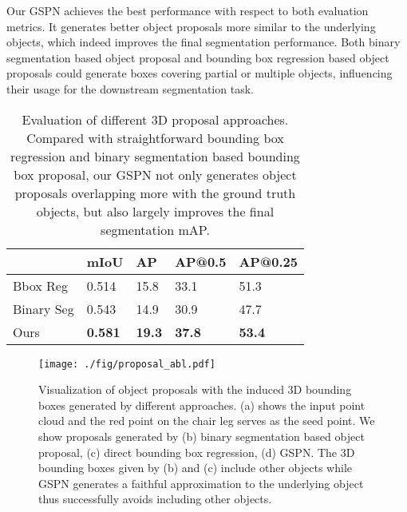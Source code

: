\documentclass[10pt,twocolumn,letterpaper]{article}
\begin{document}
Our GSPN achieves the best performance with respect to both evaluation metrics. It generates better object proposals more similar to the underlying objects, which indeed improves the final segmentation performance. Both binary segmentation based object proposal and bounding box regression based object proposals could generate boxes covering partial or multiple objects, influencing their usage for the downstream segmentation task.

\begin{table}[h]
\centering
{}
{\small
\setlength{\tabcolsep}{0.2em}
\renewcommand{\arraystretch}{0.9}
\begin{tabularx}{\columnwidth}{Y|Y|Y|Y|Y}
\toprule
     & mIoU & AP & AP@0.5 & AP@0.25\\
\midrule
   Bbox Reg & 0.514 & 15.8 & 33.1 & 51.3 \\
   Binary Seg & 0.543 & 14.9 &  30.9 & 47.7 \\
   Ours & \textbf{0.581} & \textbf{19.3} & \textbf{37.8} & \textbf{53.4} \\
\bottomrule
\end{tabularx}
}
\caption{Evaluation of different 3D proposal approaches. Compared with straightforward bounding box regression and binary segmentation based bounding box proposal, our GSPN not only generates object proposals overlapping more with the ground truth objects, but also largely improves the final segmentation mAP.}
\label{tab:abl_proposal}
\vspace{-\baselineskip}
\end{table}


\begin{figure}
    \centering
    \texttt{[image: ./fig/proposal\_abl.pdf]}
    \caption{Visualization of object proposals with the induced 3D bounding boxes generated by different approaches. (a) shows the input point cloud and the red point on the chair leg serves as the seed point. We show proposals generated by (b) binary segmentation based object proposal, (c) direct bounding box regression, (d) GSPN. The 3D bounding boxes given by (b) and (c) include other objects while GSPN generates a faithful approximation to the underlying object thus successfully avoids including other objects.}
    \label{fig:abl_proposal}
    \vspace{-1.5\baselineskip}
\end{figure}
\end{document}

